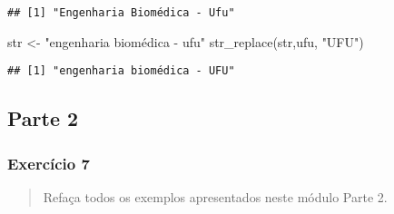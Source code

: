 \documentclass[
]{article}
\newenvironment{Shaded}{\begin{snugshade}}{\end{snugshade}}
\newcommand{\FunctionTok}[1]{\textcolor[rgb]{0.00,0.00,0.00}{#1}}
\newcommand{\NormalTok}[1]{#1}
\newcommand{\OtherTok}[1]{\textcolor[rgb]{0.56,0.35,0.01}{#1}}
\newcommand{\StringTok}[1]{\textcolor[rgb]{0.31,0.60,0.02}{#1}}
\begin{document}
\begin{verbatim}
## [1] "Engenharia Biomédica - Ufu"
\end{verbatim}

\begin{Shaded}
\begin{Highlighting}[]
\NormalTok{str }\OtherTok{\textless{}{-}} \StringTok{"engenharia biomédica {-} ufu"}
\FunctionTok{str\_replace}\NormalTok{(str,}\StringTok{\textquotesingle{}ufu\textquotesingle{}}\NormalTok{, }\StringTok{"UFU"}\NormalTok{)}
\end{Highlighting}
\end{Shaded}

\begin{verbatim}
## [1] "engenharia biomédica - UFU"
\end{verbatim}

\hypertarget{parte-2}{%
\subsection{Parte 2}\label{parte-2}}

\hypertarget{exercuxedcio-7}{%
\subsubsection{Exercício 7}\label{exercuxedcio-7}}

\begin{quote}
Refaça todos os exemplos apresentados neste módulo Parte 2.
\end{quote}
\end{document}
